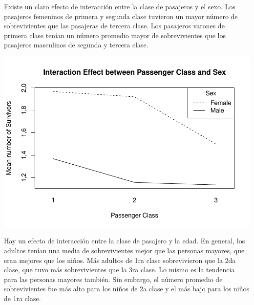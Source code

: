 \documentclass[]{article}
\newenvironment{Shaded}{\begin{snugshade}}{\end{snugshade}}
\newcommand{\KeywordTok}[1]{\textcolor[rgb]{0.13,0.29,0.53}{\textbf{#1}}}
\newcommand{\DataTypeTok}[1]{\textcolor[rgb]{0.13,0.29,0.53}{#1}}
\newcommand{\StringTok}[1]{\textcolor[rgb]{0.31,0.60,0.02}{#1}}
\newcommand{\OtherTok}[1]{\textcolor[rgb]{0.56,0.35,0.01}{#1}}
\newcommand{\OperatorTok}[1]{\textcolor[rgb]{0.81,0.36,0.00}{\textbf{#1}}}
\newcommand{\NormalTok}[1]{#1}
\begin{document}
Existe un claro efecto de interacción entre la clase de pasajeros y el
sexo. Los pasajeros femeninos de primera y segunda clase tuvieron un
mayor número de sobrevivientes que las pasajeras de tercera clase. Los
pasajeros varones de primera clase tenían un número promedio mayor de
sobrevivientes que los pasajeros masculinos de segunda y tercera clase.

\begin{Shaded}
\end{Shaded}

\includegraphics{titanicDataClean_files/figure-latex/unnamed-chunk-17-1.pdf}

Hay un efecto de interacción entre la clase de pasajero y la edad. En
general, los adultos tenían una media de sobrevivientes mejor que las
personas mayores, que eran mejores que los niños. Más adultos de 1ra
clase sobrevivieron que la 2da clase, que tuvo más sobrevivientes que la
3ra clase. Lo mismo es la tendencia para las personas mayores también.
Sin embargo, el número promedio de sobrevivientes fue más alto para los
niños de 2a clase y el más bajo para los niños de 1ra clase.
\end{document}
